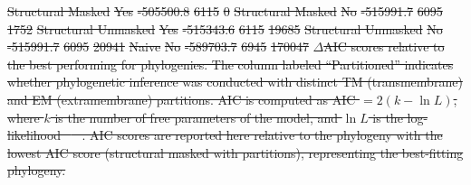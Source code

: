 \documentclass[fleqn,10pt]{wlpeerj}
\providecommand{\DIFdeltex}[1]{{\protect\color{red}\sout{#1}}}                      %
\providecommand{\DIFdelbegin}{} %
\providecommand{\DIFdel}[1]{\texorpdfstring{\DIFdeltex{#1}}{}} %
\begin{document}
\DIFdelbegin %

\DIFdel{Structural Masked }%
\DIFdel{Yes }%
\DIFdel{-505500.8 }%
\DIFdel{6115 }%
\DIFdel{0 }%
\DIFdel{Structural Masked }%
\DIFdel{No }%
\DIFdel{-515991.7 }%
\DIFdel{6095 }%
\DIFdel{1752 }%
\DIFdel{Structural Unmasked }%
\DIFdel{Yes }%
\DIFdel{-515343.6 }%
\DIFdel{6115 }%
\DIFdel{19685 }%
\DIFdel{Structural Unmasked }%
\DIFdel{No }%
\DIFdel{-515991.7 }%
\DIFdel{6095 }%
\DIFdel{20941 }%
\DIFdel{Naive }%
\DIFdel{No }%
\DIFdel{-589703.7 }%
\DIFdel{6945 }%
\DIFdel{170047 }%
{%
\DIFdel{$\Delta$AIC scores relative to the best performing for phylogenies. The column labeled ``Partitioned'' indicates whether phylogenetic inference was conducted with distinct TM (transmembrane) and EM (extramembrane) partitions. AIC is computed as AIC $= 2(k - \ln L)$, where $k$ is the number of free parameters of the model, and $\ln L$ is the log-likelihood \mbox{%
\citep{Akaike1974,BurnhamAnderson2004}
}%
. AIC scores are reported here relative to the phylogeny with the lowest AIC score (structural masked with partitions), representing the best-fitting phylogeny.}}
\end{document}
